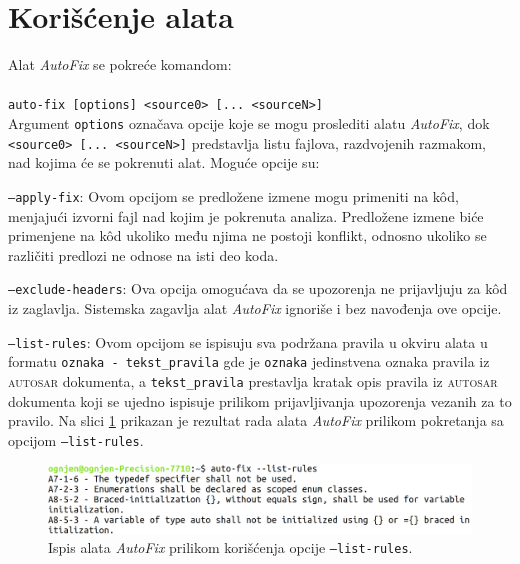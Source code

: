 \documentclass[12pt,oneside]{memoir}
\begin{document}
\section{Kori\v{s}\'{c}enje alata}

Alat \textit{AutoFix} se pokre\'{c}e komandom:
\\ \\
 \indent \indent \texttt{auto-fix [options] <source0> [... <sourceN>]} \\

\noindent Argument \texttt{options} ozna\v{c}ava opcije koje se mogu proslediti alatu \textit{AutoFix},
dok \texttt{<source0> [... <sourceN>]} predstavlja listu fajlova, razdvojenih razmakom, nad kojima će se pokrenuti alat. 
Mogu\'{c}e opcije su:
  \begin{description}
    \item \texttt{--apply-fix}: Ovom opcijom se predlo\v{z}ene izmene mogu primeniti na k\^{o}d, menjaju\'{c}i izvorni fajl nad kojim je pokrenuta analiza.
    Predlo\v{z}ene izmene bi\'{c}e primenjene na k\^{o}d ukoliko među njima ne postoji konflikt, odnosno ukoliko se razli\v{c}iti predlozi ne odnose na isti deo koda.
    \item \texttt{--exclude-headers}: Ova opcija omogu\'{c}ava da se upozorenja ne prijavljuju za k\^{o}d iz zaglavlja. Sistemska zagavlja alat
    \textit{AutoFix} ignori\v{s}e i bez navođenja ove opcije.
    \item \texttt{--list-rules}: Ovom opcijom se ispisuju sva podr\v{z}ana pravila u okviru alata u formatu \texttt{oznaka - tekst\_pravila} gde je \texttt{oznaka} jedinstvena oznaka pravila iz \textsc{autosar} dokumenta, a \texttt{tekst\_pravila} prestavlja kratak opis pravila iz \textsc{autosar} dokumenta koji se ujedno ispisuje prilikom prijavljivanja upozorenja vezanih za to pravilo. Na slici \ref{fig:listRules} prikazan je rezultat rada alata \textit{AutoFix} prilikom pokretanja sa opcijom \texttt{--list-rules}.

    \begin{figure}[!h]
    \begin{center}
    \includegraphics[scale=0.22]{listRules.png}
    \end{center}
    \caption{Ispis alata \textit{AutoFix} prilikom kori\v{s}\'{c}enja opcije \texttt{--list-rules}.}
    \label{fig:listRules}
    \end{figure}


\end{description}
\end{document}
